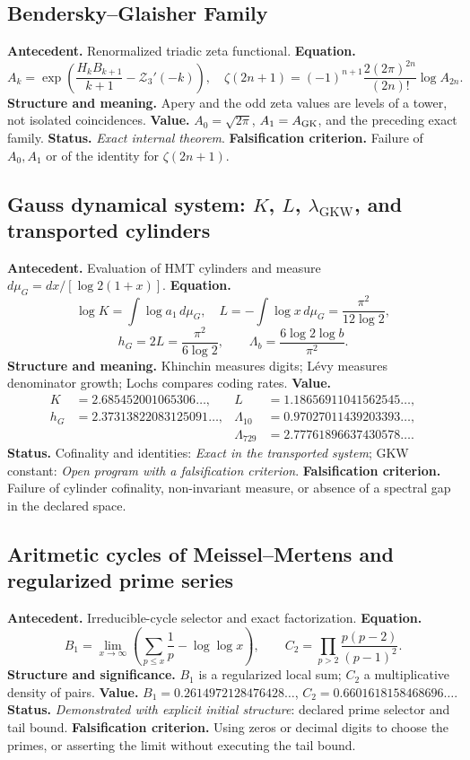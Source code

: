 \subsection*{Bendersky--Glaisher Family }
\textbf{Antecedent.} Renormalized triadic zeta functional.
\textbf{Equation.}
\[
A_k=\exp\!\left(\frac{H_kB_{k+1}}{k+1}-\mathcal Z_3'(-k)\right),
\quad
\zeta(2n+1)=(-1)^{n+1}\frac{2(2\pi)^{2n}}{(2n)!}\log A_{2n}.
\]
\textbf{Structure and meaning.} Apery and the odd zeta values are levels of a tower, not isolated coincidences. \textbf{Value.} \(A_0=\sqrt{2\pi}\), \(A_1=A_{\rm GK}\), and the preceding exact family. \textbf{Status.} \emph{Exact internal theorem}. \textbf{Falsification criterion.} Failure of \(A_0,A_1\) or of the identity for \(\zeta(2n+1)\).

\subsection*{Gauss dynamical system: \(K\), \(L\), \(\lambda_{\mathrm{GKW}}\), and transported cylinders}
\textbf{Antecedent.} Evaluation of HMT cylinders and measure
\(d\mu_G=dx/[\log2(1+x)]\). \textbf{Equation.}
\[
\log K=\int\log a_1\,d\mu_G,\quad
L=-\int\log x\,d\mu_G=\frac{\pi^2}{12\log2},
\]
\[
h_G=2L=\frac{\pi^2}{6\log2},\qquad
\Lambda_b=\frac{6\log2\log b}{\pi^2}.
\]
\textbf{Structure and meaning.} Khinchin measures digits; Lévy measures
denominator growth; Lochs compares coding rates.
\textbf{Value.}
\begin{align*}
K&=2.685452001065306\ldots,
&L&=1.18656911041562545\ldots,\\
h_G&=2.37313822083125091\ldots,
&\Lambda_{10}&=0.97027011439203393\ldots,\\
&&\Lambda_{729}&=2.77761896637430578\ldots.
\end{align*}
\textbf{Status.} Cofinality and identities: \emph{Exact in the transported
system}; GKW constant: \emph{Open program with a falsification criterion}.
\textbf{Falsification criterion.} Failure of cylinder cofinality, non-invariant measure, or absence
of a spectral gap in the declared space.

\subsection*{Aritmetic cycles of Meissel--Mertens and regularized prime series}
\textbf{Antecedent.} Irreducible-cycle selector and exact
factorization. \textbf{Equation.}
\[
B_1=\lim_{x\to\infty}\left(\sum_{p\le x}\frac1p-\log\log x\right),
\qquad
C_2=\prod_{p>2}\frac{p(p-2)}{(p-1)^2}.
\]
\textbf{Structure and significance.} \(B_1\) is a regularized local sum;
\(C_2\) a multiplicative density of pairs. \textbf{Value.}
\(B_1=0.2614972128476428\ldots\),
\(C_2=0.6601618158468696\ldots\). \textbf{Status.}
\emph{Demonstrated with explicit initial structure}: declared prime selector and
tail bound. \textbf{Falsification criterion.} Using zeros or decimal digits to choose
the primes, or asserting the limit without executing the tail bound.

